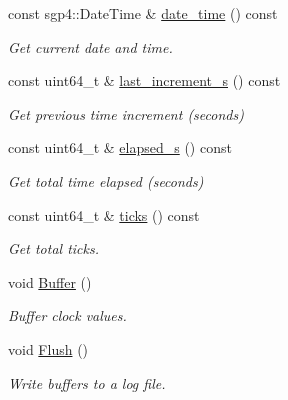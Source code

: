 \begin{DoxyCompactItemize}
const sgp4\+::\+Date\+Time \& \hyperlink{classosse_1_1collaborate_1_1_simulation_clock_a089b6bf38ec18dde18a1aff638154269}{date\+\_\+time} () const
\begin{DoxyCompactList}\small\item\em Get current date and time. \end{DoxyCompactList}\item 
const uint64\+\_\+t \& \hyperlink{classosse_1_1collaborate_1_1_simulation_clock_a067a244986cc830bc796316db4b98358}{last\+\_\+increment\+\_\+s} () const
\begin{DoxyCompactList}\small\item\em Get previous time increment (seconds) \end{DoxyCompactList}\item 
const uint64\+\_\+t \& \hyperlink{classosse_1_1collaborate_1_1_simulation_clock_a7c4d4f02803231b0d06a80081d73c206}{elapsed\+\_\+s} () const
\begin{DoxyCompactList}\small\item\em Get total time elapsed (seconds) \end{DoxyCompactList}\item 
const uint64\+\_\+t \& \hyperlink{classosse_1_1collaborate_1_1_simulation_clock_a0791fb7aeb5fb252f8a57e572dab823a}{ticks} () const
\begin{DoxyCompactList}\small\item\em Get total ticks. \end{DoxyCompactList}\item 
\mbox{\label{classosse_1_1collaborate_1_1_simulation_clock_a2d9985044f9f5c90a87c38bb16e25c2a}} 
void \hyperlink{classosse_1_1collaborate_1_1_simulation_clock_a2d9985044f9f5c90a87c38bb16e25c2a}{Buffer} ()
\begin{DoxyCompactList}\small\item\em Buffer clock values. \end{DoxyCompactList}\item 
\mbox{\label{classosse_1_1collaborate_1_1_simulation_clock_ac9d66ec221a35419d5ccc2aecfcf3cc9}} 
void \hyperlink{classosse_1_1collaborate_1_1_simulation_clock_ac9d66ec221a35419d5ccc2aecfcf3cc9}{Flush} ()
\begin{DoxyCompactList}\small\item\em Write buffers to a log file. \end{DoxyCompactList}\end{DoxyCompactItemize}
